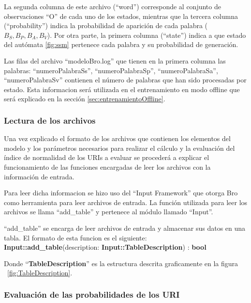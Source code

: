 La segunda columna de este archivo (``word'') corresponde al conjunto de observaciones ``O'' de cada uno de los estados, mientras que la tercera columna (``probability'') indica la probabilidad de aparición de cada palabra ($B_{S}, B_{P}, B_{A}, B_{V}$). Por otra parte, la primera columna (``state'') indica a que estado del autómata \ref{fig:ssm} pertenece cada palabra y su probabilidad de generación.

Las filas del archivo ``modeloBro.log'' que tienen en la primera columna las palabras: ``numeroPalabraSs'', ``numeroPalabraSp'', ``numeroPalabraSa'', ``numeroPalabraSv'' contienen el número de palabras que han sido procesadas por estado. Esta informacion será utilizada en el entrenamiento en modo offline que será explicado en la sección \ref{sec:entrenamientoOffline}.

\subsubsection*{Lectura de los archivos}

Una vez explicado el formato de los archivos que contienen los elementos del modelo y los parámetros necesarios para realizar el cálculo y la evaluación del índice de normalidad de los URIs a evaluar se procederá a explicar el funcionamiento de las funciones encargadas de leer los archivos con la información de entrada.

Para leer dicha informacion se hizo uso del  ``Input Framework'' que otorga Bro como herramienta para leer archivos de entrada. La función utilizada para leer los archivos se llama ``add\_table'' y pertenece al módulo llamado ``Input''.

``add\_table'' se encarga de leer archivos de entrada y almacenar sus datos en una tabla. El formato de esta funcion es el siguiente:\\
%
\textbf{Input::add\_table}(description: \textbf{Input::TableDescription}) : \textbf{bool} 

Donde ``\textbf{TableDescription}'' es la estructura descrita graficamente en
la figura ~\ref{fig:TableDescription}.

\subsubsection{Evaluación de las probabilidades de los URI}

